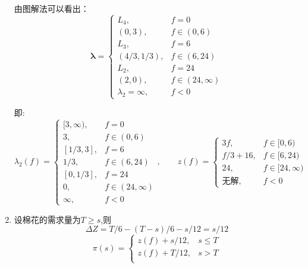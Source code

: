 \documentclass[UTF8]{ctexart}
\begin{document}
\begin{enumerate}
由图解法可以看出：
\[\bm{\lambda} = \begin{cases}
L_4,& f=0\\
(0,3),& f\in (0,6)\\
L_3,& f=6\\
(4/3,1/3),& f \in (6,24)\\
L_2,&f=24\\
(2,0),& f \in (24,\infty)\\
\lambda_2=\infty,& f<0
\end{cases}\]

即:
\[\lambda_2(f) = \begin{cases}
[3,\infty),& f=0\\
3,& f\in (0,6)\\
[1/3,3],& f=6\\
1/3,& f \in (6,24)\\
[0,1/3],&f=24\\
0,& f \in (24,\infty)\\
\infty,& f<0
\end{cases},\qquad
z(f) = \begin{cases}
3f,& f\in [0,6)\\
f/3+16,& f \in [6,24)\\
24,& f \in [24,\infty)\\
\text{无解},& f<0
\end{cases}\]

\item
设棉花的需求量为$T\geq s$,则
\[\Delta Z=T/6-(T-s)/6-s/12=s/12\]
\[\pi(s) = \begin{cases}
z(f)+s/12,& s \leq T\\
z(f)+T/12,& s > T\\
\end{cases}\]
\end{enumerate}
\end{document}
